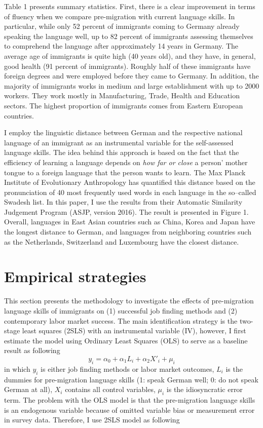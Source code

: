\documentclass[12pt,a4paper]{article}
\begin{document}
Table 1 presents summary statistics. First, there is a clear improvement in terms of fluency when we compare pre-migration with current language skills. In particular, while only 52 percent of immigrants coming to Germany already speaking the language well, up to 82 percent of immigrants assessing themselves to comprehend the language after approximately 14 years in Germany. The average age of immigrants is quite high (40 years old), and they have, in general, good health (91 percent of immigrants). Roughly half of these immigrants have foreign degrees and were employed before they came to Germany. In addition, the majority of immigrants works in medium and large establishment with up to 2000 workers. They work mostly in Manufacturing, Trade, Health and Education sectors. The highest proportion of immigrants comes from Eastern European countries.

I employ the linguistic distance between German and the respective national language of an immigrant as an instrumental variable for the self-assessed language skills. The idea behind this approach is based on the fact that the efficiency of learning a language depends on \textit{how far or close} a person' mother tongue to a foreign language that the person wants to learn. The Max Planck Institute of Evolutionary Anthropology has quantified this distance based on the pronunciation of 40 most frequently used words in each language in the so--called Swadesh list. In this paper, I use the results from their Automatic Similarity Judgement Program (ASJP, version 2016). The result is presented in Figure 1. Overall, languages in East Asian countries such as China, Korea and Japan have the longest distance to German, and languages from neighboring countries such as the Netherlands, Switzerland and Luxembourg have the closest distance.

\section{Empirical strategies}

This section presents the methodology to investigate the effects of pre-migration language skills of immigrants on (1) successful job finding methods and (2) contemporary labor market success. The main identification strategy is the two-stage least squares (2SLS) with an instrumental variable (IV), however, I first estimate the model using Ordinary Least Squares (OLS) to serve as a baseline result as following
$$y_{i}=\alpha_{0}+\alpha_{1}L_{i}+\alpha_{2}X'_{i}+\mu_{i}$$
in which $y_{i}$ is either job finding methods or labor market outcomes, $L_{i}$ is the dummies for pre-migration language skills (1: speak German well; 0: do not speak German at all), $X_{i}$ contains all control variables, $\mu_{i}$ is the idiosyncratic error term. The problem with the OLS model is that the pre-migration language skills is an endogenous variable because of omitted variable bias or measurement error in survey data. Therefore, I use 2SLS model as following
\end{document}
